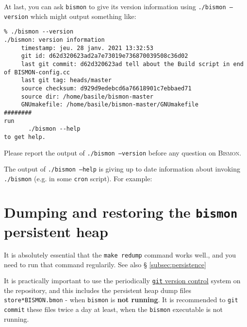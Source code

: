 \begin{appendices}
At last, you can ask \texttt{bismon} to give its version information
using \texttt{./bismon --version} which might output something like:

\begin{relsize}{-1}
\begin{verbatim}
% ./bismon --version
./bismon: version information
	 timestamp: jeu. 28 janv. 2021 13:32:53
	 git id: d62d320623ad2a7e73019e736870039508c36d02
	 last git commit: d62d320623ad tell about the Build script in end of BISMON-config.cc
	 last git tag: heads/master
	 source checksum: d929d9edebcd6a76618901c7ebbaed71
	 source dir: /home/basile/bismon-master
	 GNUmakefile: /home/basile/bismon-master/GNUmakefile
########
run
	   ./bismon --help
to get help.
\end{verbatim}
\end{relsize}

Please report the output of \texttt{./bismon --version} before any question on \textsc{Bismon}.

The output of \texttt{./bismon --help} is giving up to date
information about invoking \texttt{./bismon} (e.g. in some
\texttt{cron} script). For example:

\begin{relsize}{-1.5}

\end{relsize}

\section{Dumping and restoring the \texttt{bismon} persistent heap}
\label{sec:dumping-restoring-heap}

It is absolutely essential that the \texttt{make redump} command works
well., and you need to run that command regularily.
 See also \S
\ref{subsec:persistence}

It is practically important to use the periodically
\href{http://git-scm.com/}{\texttt{git} version control} system on the
repository, and this includes the persistent heap dump files
\texttt{store*BISMON.bmon} - when \texttt{bismon} is \textbf{not
  running}. It is recommended to \texttt{git commit} these files twice
a day at least, when the \texttt{bismon} executable is not running.

\end{appendices}
